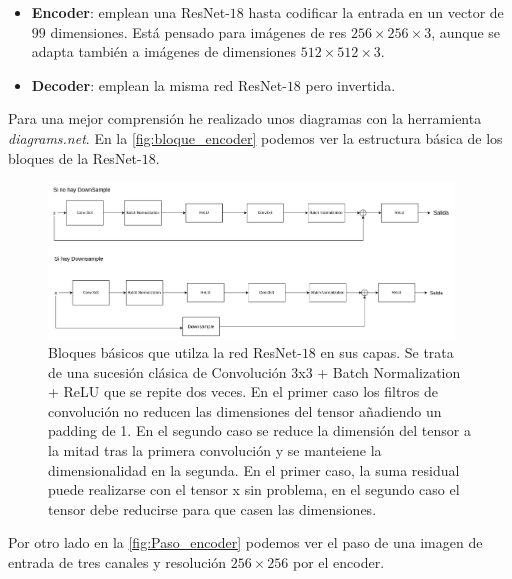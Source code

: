             \begin{itemize}
                \item \textbf{Encoder}: emplean una ResNet-$18$  hasta codificar la entrada en un vector de $99$ dimensiones. Está pensado para imágenes de res $256 \times 256 \times 3$, aunque se adapta también a imágenes de dimensiones $512 \times 512 \times 3$.
                \item \textbf{Decoder}: emplean la misma red ResNet-$18$ pero invertida.
            \end{itemize}

            \noindent Para una mejor comprensión he realizado unos diagramas con la herramienta \textit{diagrams.net}. En la \autoref{fig:bloque_encoder} podemos ver la estructura básica de los bloques de la ResNet-$18$.

            \begin{figure}[!h]
                \centering
                \includegraphics[width=0.96\textwidth]{img/bloque_basico_encoder.png}
                \caption{Bloques básicos que utilza la red ResNet-$18$ en sus capas. Se trata de una sucesión clásica de Convolución 3x3 + Batch Normalization + ReLU que se repite dos veces. En el primer caso los filtros de convolución no reducen las dimensiones del tensor añadiendo un padding de 1. En el segundo caso se reduce la dimensión del tensor a la mitad tras la primera convolución y se manteiene la dimensionalidad en la segunda. En el primer caso, la suma residual puede realizarse con el tensor x sin problema, en el segundo caso el tensor debe reducirse para que casen las dimensiones.}
                \label{fig:bloque_encoder}
            \end{figure}

            \medskip 

            \noindent Por otro lado en la \autoref{fig:Paso_encoder} podemos ver el paso de una imagen de entrada de tres canales y resolución $256 \times 256$ por el encoder.


